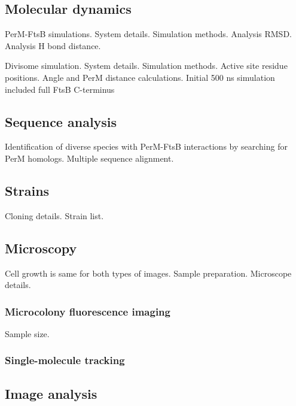 \documentclass[pdflatex,sn-basic]{sn-jnl}%
\begin{document}
\loremipsum{}

\subsection{Molecular dynamics}

PerM-FtsB simulations.
System details.
Simulation methods.
Analysis RMSD.
Analysis H bond distance.

Divisome simulation. System details. Simulation methods. Active site residue positions. Angle and PerM distance calculations.
Initial 500 ns simulation included full FtsB C-terminus

\loremipsum{}

\subsection{Sequence analysis}

Identification of diverse species with PerM-FtsB interactions by searching for PerM homologs.
Multiple sequence alignment.

\loremipsum{}

\subsection{Strains}

Cloning details.
Strain list.

\loremipsum{} 

\subsection{Microscopy}

Cell growth is same for both types of images.
Sample preparation.
Microscope details.

\loremipsum{}

\subsubsection{Microcolony fluorescence imaging}

Sample size.

\loremipsum{} 

\subsubsection{Single-molecule tracking}

\loremipsum{} 

\subsection{Image analysis}
\end{document}

